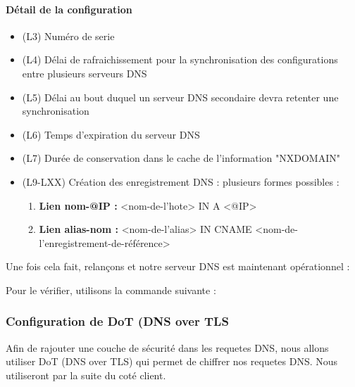 \documentclass{article}
\begin{document}
\paragraph{Détail de la configuration}
\begin{itemize}
	\item (L3) Numéro de serie
	\item (L4) Délai de rafraichissement pour la synchronisation des configurations entre plusieurs serveurs DNS
	\item (L5) Délai au bout duquel un serveur DNS secondaire devra retenter une synchronisation
	\item (L6) Temps d'expiration du serveur DNS
	\item (L7) Durée de conservation dans le cache de l'information "NXDOMAIN"
	\item (L9-LXX) Création des enregistrement DNS : plusieurs formes possibles :
	\begin{enumerate}
		\item \textbf{Lien nom-@IP :}	<nom-de-l'hote>   	IN	A		<@IP>
		\item \textbf{Lien alias-nom :}	<nom-de-l'alias> 	IN	CNAME 	<nom-de-l'enregistrement-de-référence>
	\end{enumerate}		  
\end{itemize}

Une fois cela fait, relançons  et notre serveur DNS est maintenant opérationnel :

Pour le vérifier, utilisons la commande suivante :

\subsubsection{Configuration de DoT (DNS over TLS}
Afin de rajouter une couche de sécurité dans les requetes DNS, nous allons utiliser DoT (DNS over TLS) qui permet de chiffrer nos requetes DNS. Nous utiliseront par la suite  du coté client.
\end{document}
